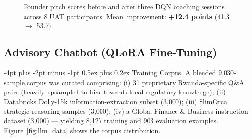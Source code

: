 \documentclass{article}
\makeatletter
\renewcommand\paragraph{\@startsection{paragraph}{4}{\z@}%
  {-4pt plus -2pt minus -1pt}%
  {0.5ex plus 0.2ex}%
  {\normalsize\bf}}
\makeatother
\begin{document}
\begin{figure}[htbp]
\centering
{}
\caption{Founder pitch scores before and after three DQN coaching sessions
         across 8 UAT participants. Mean improvement: \textbf{+12.4 points}
         (41.3 $\to$ 53.7).}
\label{fig:before_after}
\end{figure}

\FloatBarrier
\subsection{Advisory Chatbot (QLoRA Fine-Tuning)}
\label{sec:llm}

\paragraph{Training Corpus.}
A blended 9{,}030-sample corpus was curated comprising: (i) 31 proprietary
Rwanda-specific Q\&A pairs (heavily upsampled to bias towards local regulatory
knowledge); (ii) Databricks Dolly-15k information-extraction subset (3{,}000);
(iii) SlimOrca strategic-reasoning samples (3{,}000); (iv) a Global Finance
\& Business instruction dataset (3{,}000) --- yielding 8{,}127 training and 903
evaluation examples.
Figure~\ref{fig:llm_data} shows the corpus distribution.
\end{document}

